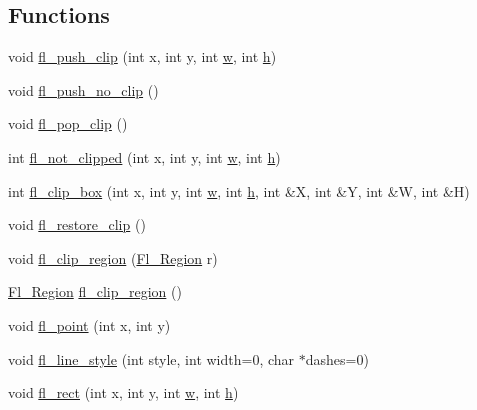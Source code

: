 \subsection*{Functions}
\begin{DoxyCompactItemize}
\item 
void \hyperlink{group__fl__drawings_gabe60242ba3b975800717b95cb6bc06d2}{fl\+\_\+push\+\_\+clip} (int x, int y, int \hyperlink{forms_8_h_aac374e320caaadeca4874add33b62af2}{w}, int \hyperlink{forms_8_h_a7e427ba5b307f9068129699250690066}{h})
\item 
void \hyperlink{group__fl__drawings_ga0fce6c81d69c3a80c8073a338f1346fd}{fl\+\_\+push\+\_\+no\+\_\+clip} ()
\item 
void \hyperlink{group__fl__drawings_ga7abb216a9a87408c8926126cc9efce22}{fl\+\_\+pop\+\_\+clip} ()
\item 
int \hyperlink{group__fl__drawings_ga2bd899d466196ffc26cc61542ee10539}{fl\+\_\+not\+\_\+clipped} (int x, int y, int \hyperlink{forms_8_h_aac374e320caaadeca4874add33b62af2}{w}, int \hyperlink{forms_8_h_a7e427ba5b307f9068129699250690066}{h})
\item 
int \hyperlink{group__fl__drawings_ga6ec7356beb51a8f1d2b987f4d00f42d8}{fl\+\_\+clip\+\_\+box} (int x, int y, int \hyperlink{forms_8_h_aac374e320caaadeca4874add33b62af2}{w}, int \hyperlink{forms_8_h_a7e427ba5b307f9068129699250690066}{h}, int \&X, int \&Y, int \&W, int \&H)
\item 
void \hyperlink{group__fl__drawings_gaf98789ec460134ffc81f2af2d2db6857}{fl\+\_\+restore\+\_\+clip} ()
\item 
void \hyperlink{group__fl__drawings_gab12cb4aaa22092a0f2ae3d349c57f234}{fl\+\_\+clip\+\_\+region} (\hyperlink{mac_8_h_ac80c9f95cc93c989c5a953a749f45cb6}{Fl\+\_\+\+Region} r)
\item 
\hyperlink{mac_8_h_ac80c9f95cc93c989c5a953a749f45cb6}{Fl\+\_\+\+Region} \hyperlink{group__fl__drawings_ga259fc45a0997b1bae7660c01af943457}{fl\+\_\+clip\+\_\+region} ()
\item 
void \hyperlink{group__fl__drawings_ga2145abaa848e9ce2da4d566b0dc54f6f}{fl\+\_\+point} (int x, int y)
\item 
void \hyperlink{group__fl__drawings_ga75ac53c05a97bbb01a22ff56a382f52d}{fl\+\_\+line\+\_\+style} (int style, int width=0, char $\ast$dashes=0)
\item 
void \hyperlink{group__fl__drawings_ga690c83e11f49fa837b563f4c0bc4fd1b}{fl\+\_\+rect} (int x, int y, int \hyperlink{forms_8_h_aac374e320caaadeca4874add33b62af2}{w}, int \hyperlink{forms_8_h_a7e427ba5b307f9068129699250690066}{h})

\end{DoxyCompactItemize}
